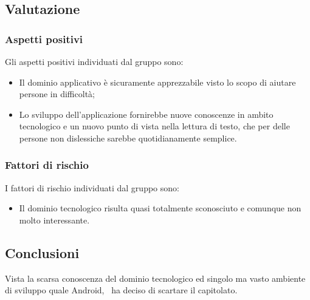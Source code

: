 \documentclass[../StudioDiFattibilita.tex]{subfiles}
\begin{document}
		\subsection{Valutazione}
			\subsubsection{Aspetti positivi}
				Gli aspetti positivi individuati dal gruppo sono:
					\begin{itemize}
						\item Il dominio applicativo è sicuramente apprezzabile visto lo scopo di aiutare persone
						in difficoltà;
						\item Lo sviluppo dell'applicazione fornirebbe nuove conoscenze in ambito tecnologico e
						un nuovo punto di vista nella lettura di testo, che per delle persone non dislessiche
						sarebbe quotidianamente semplice.
					\end{itemize}
			\subsubsection{Fattori di rischio}
				I fattori di rischio individuati dal gruppo sono:
				\begin{itemize}
					\item Il dominio tecnologico risulta quasi totalmente sconosciuto e comunque non molto
					interessante.
				\end{itemize}
			\subsection{Conclusioni}
				Vista la scarsa conoscenza del dominio tecnologico ed singolo ma vasto ambiente di sviluppo quale
				Android, \kaleidoscode\ ha deciso di scartare il capitolato.
\end{document}
